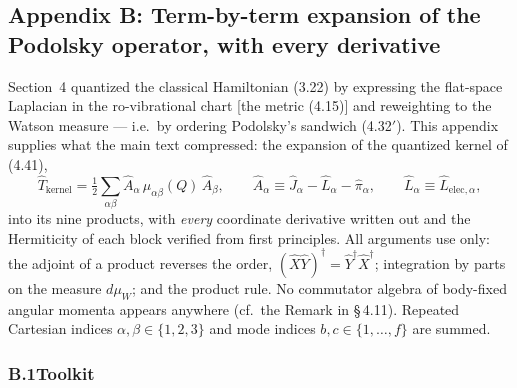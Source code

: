 \subsection*{Appendix B: Term-by-term expansion of the Podolsky operator, with every derivative}

Section~4 quantized the classical Hamiltonian (3.22) by expressing the flat-space Laplacian in the ro-vibrational chart [the metric (4.15)] and reweighting to the Watson measure --- i.e.\ by ordering Podolsky's sandwich (4.32$'$). This appendix supplies what the main text compressed: the expansion of the quantized kernel of (4.41),
\begin{equation}
\hat T_{\mathrm{kernel}}=\tfrac12\sum_{\alpha\beta}\hat A_\alpha\,\mu_{\alpha\beta}(Q)\,\hat A_\beta,\qquad
\hat A_\alpha\equiv\hat J_\alpha-\hat L_\alpha-\hat\pi_\alpha,\qquad
\hat L_\alpha\equiv\hat L_{\mathrm{elec},\alpha}, \tag{B.1}
\end{equation}
into its nine products, with \emph{every} coordinate derivative written out and the Hermiticity of each block verified from first principles. All arguments use only: the adjoint of a product reverses the order, $(\hat X\hat Y)^{\dagger}=\hat Y^{\dagger}\hat X^{\dagger}$; integration by parts on the measure $d\mu_W$; and the product rule. No commutator algebra of body-fixed angular momenta appears anywhere (cf.\ the Remark in \S\,4.11). Repeated Cartesian indices $\alpha,\beta\in\{1,2,3\}$ and mode indices $b,c\in\{1,\dots,f\}$ are summed.

\subsubsection*{B.1\quad Toolkit}

